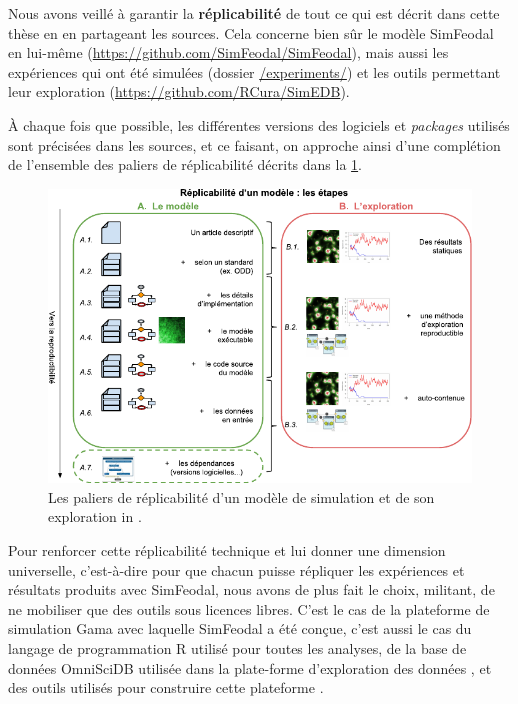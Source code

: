 Nous avons veillé à garantir la \textbf{réplicabilité} de tout ce qui est décrit dans cette thèse en en partageant les sources.
Cela concerne bien sûr le modèle SimFeodal en lui-même (\href{https://github.com/SimFeodal/SimFeodal}{https://github.com/SimFeodal/SimFeodal}), mais aussi les expériences qui ont été simulées (dossier \href{https://github.com/SimFeodal/SimFeodal/tree/master/experiments}{\textsf{/experiments/}}) et les outils permettant leur exploration (\href{https://github.com/RCura/SimEDB}{https://github.com/RCura/SimEDB}).

À chaque fois que possible, les différentes versions des logiciels et \textit{packages} utilisés sont précisées dans les sources, et ce faisant, on approche ainsi d'une complétion de l'ensemble des \og paliers de réplicabilité\fg{} décrits dans la \cref{fig:paliers-replicabilite}.

\begin{figure}[H]
	\centering
	\includegraphics[width=\linewidth]{img/schema_reproductibilite.pdf}
	\caption[Les paliers de réplicabilité d’un modèle de simulation et de son exploration.]{\og Les paliers de réplicabilité d’un modèle de simulation et de son exploration \fg{} in \textcite[fig. 3, \ppno~427]{reycoyrehourcq:hal-01677950}.}
	\label{fig:paliers-replicabilite}
\end{figure}

Pour renforcer cette réplicabilité technique et lui donner une dimension universelle, c'est-à-dire pour que chacun puisse répliquer les expériences et résultats produits avec SimFeodal, nous avons de plus fait le choix, militant, de ne mobiliser que des outils sous licences libres.
C'est le cas de la plateforme de simulation Gama \autocite{taillandier_building_2018} avec laquelle SimFeodal a été conçue, c'est aussi le cas du langage de programmation R \autocite{r_core_team_r_2019} utilisé pour toutes les analyses, de la base de données OmniSciDB utilisée dans la plate-forme d'exploration des données \autocite{root_mapd_2016}, et des outils utilisés pour construire cette plateforme \autocite[par exemple]{chang_shiny_2017}.

